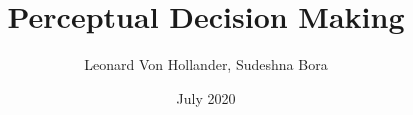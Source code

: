 \title{Perceptual Decision Making}
\author{Leonard Von Hollander, Sudeshna Bora}
\date{July 2020}

\begin{titlepage}

\maketitle

\end{titlepage}
